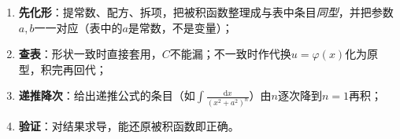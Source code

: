 \begin{enumerate}
  \item \textbf{先化形}：提常数、配方、拆项，把被积函数整理成与表中条目\emph{同型}，并把参数$a,b$一一对应（表中的$a$是常数，不是变量）；
  \item \textbf{查表}：形状一致时直接套用，$C$不能漏；不一致时作代换$u=\varphi(x)$化为原型，积完再回代；
  \item \textbf{递推降次}：给出递推公式的条目（如$\int\frac{\mathrm{d}x}{(x^2+a^2)^n}$）由$n$逐次降到$n=1$再积；
  \item \textbf{验证}：对结果求导，能还原被积函数即正确。
\end{enumerate}

